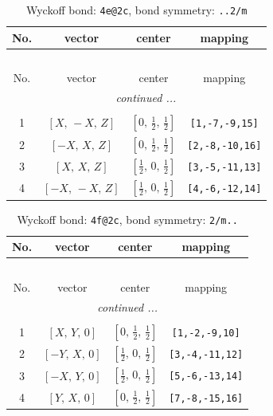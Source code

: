 \documentclass[fleqn,8pt]{jsarticle}
\begin{document}
\renewcommand{\arraystretch}{1.2}
\begin{longtable}{cccc}
\caption{Wyckoff bond: {\tt 4e@2c}, bond symmetry: {\tt ..2/m}}
 \\
 \hline \hline
No. & vector & center & mapping \\ \hline \endfirsthead

\multicolumn{3}{l}{\tablename\ \thetable{}} \\
 \hline \hline
No. & vector & center & mapping \\ \hline \endhead

 \hline \hline
\multicolumn{3}{r}{\footnotesize\it continued ...} \\ \endfoot

 \hline \hline
\multicolumn{3}{r}{} \\ \endlastfoot

1 & $\left[ X,\, - X,\, Z \right]$ & $\left[ 0,\, \frac{1}{2},\, \frac{1}{2} \right]$ & {\tt [1,-7,-9,15]} \\ \hline
2 & $\left[ - X,\, X,\, Z \right]$ & $\left[ 0,\, \frac{1}{2},\, \frac{1}{2} \right]$ & {\tt [2,-8,-10,16]} \\ \hline
3 & $\left[ X,\, X,\, Z \right]$ & $\left[ \frac{1}{2},\, 0,\, \frac{1}{2} \right]$ & {\tt [3,-5,-11,13]} \\ \hline
4 & $\left[ - X,\, - X,\, Z \right]$ & $\left[ \frac{1}{2},\, 0,\, \frac{1}{2} \right]$ & {\tt [4,-6,-12,14]} \\
\end{longtable}
\renewcommand{\arraystretch}{1.2}
\begin{longtable}{cccc}
\caption{Wyckoff bond: {\tt 4f@2c}, bond symmetry: {\tt 2/m..}}
 \\
 \hline \hline
No. & vector & center & mapping \\ \hline \endfirsthead

\multicolumn{3}{l}{\tablename\ \thetable{}} \\
 \hline \hline
No. & vector & center & mapping \\ \hline \endhead

 \hline \hline
\multicolumn{3}{r}{\footnotesize\it continued ...} \\ \endfoot

 \hline \hline
\multicolumn{3}{r}{} \\ \endlastfoot

1 & $\left[ X,\, Y,\, 0 \right]$ & $\left[ 0,\, \frac{1}{2},\, \frac{1}{2} \right]$ & {\tt [1,-2,-9,10]} \\ \hline
2 & $\left[ - Y,\, X,\, 0 \right]$ & $\left[ \frac{1}{2},\, 0,\, \frac{1}{2} \right]$ & {\tt [3,-4,-11,12]} \\ \hline
3 & $\left[ - X,\, Y,\, 0 \right]$ & $\left[ \frac{1}{2},\, 0,\, \frac{1}{2} \right]$ & {\tt [5,-6,-13,14]} \\ \hline
4 & $\left[ Y,\, X,\, 0 \right]$ & $\left[ 0,\, \frac{1}{2},\, \frac{1}{2} \right]$ & {\tt [7,-8,-15,16]} \\
\end{longtable}
\end{document}
